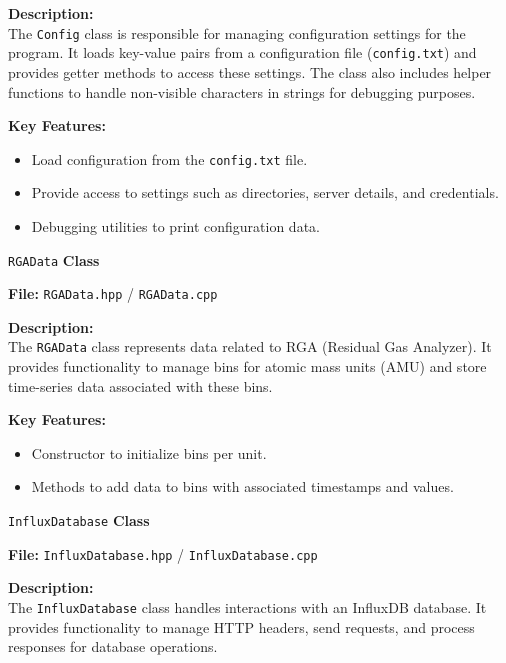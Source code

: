 \documentclass{article}
\begin{document}
\vspace{5pt}
\noindent
\textbf{Description:}
\\
\noindent
The \texttt{Config} class is responsible for managing configuration settings for the program. It loads key-value pairs from a configuration file (\texttt{config.txt}) and provides getter methods to access these settings. The class also includes helper functions to handle non-visible characters in strings for debugging purposes.

\vspace{5pt}
\noindent
\textbf{Key Features:}
\begin{itemize}
    \item Load configuration from the \texttt{config.txt} file.
    \item Provide access to settings such as directories, server details, and credentials.
    \item Debugging utilities to print configuration data.
\end{itemize}

\vspace{15pt}
\noindent
\texttt{RGAData} \textbf{Class}

\vspace{5pt}
\noindent
\textbf{File:} \texttt{RGAData.hpp} / \texttt{RGAData.cpp} 

\vspace{5pt}
\noindent
\textbf{Description:}
\\
\noindent
The \texttt{RGAData} class represents data related to RGA (Residual Gas Analyzer). It provides functionality to manage bins for atomic mass units (AMU) and store time-series data associated with these bins.

\vspace{5pt}
\noindent
\textbf{Key Features:}
\begin{itemize}
    \item Constructor to initialize bins per unit.
    \item Methods to add data to bins with associated timestamps and values.
\end{itemize}

\vspace{15pt}
\noindent
\texttt{InfluxDatabase} \textbf{Class}

\vspace{5pt}
\noindent
\textbf{File:} \texttt{InfluxDatabase.hpp} / \texttt{InfluxDatabase.cpp} 

\vspace{5pt}
\noindent
\textbf{Description:}
\\
\noindent
The \texttt{InfluxDatabase} class handles interactions with an InfluxDB database. It provides functionality to manage HTTP headers, send requests, and process responses for database operations.
\end{document}
